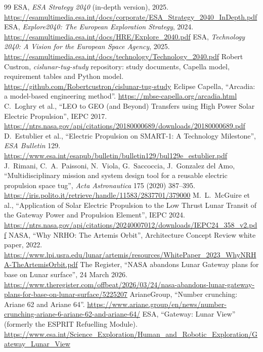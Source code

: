 \documentclass[11pt,a4paper]{article}
\newcommand{\studyauthor}{Robert Custron}
\newcommand{\repourl}{https://github.com/Robertcustron/cislunar-tug-study}
\begin{document}
\begin{thebibliography}{99}\small
\setlength{\itemsep}{1pt}
 ESA, \emph{ESA Strategy 2040} (in-depth version), 2025. \url{https://esamultimedia.esa.int/docs/corporate/ESA_Strategy_2040_InDepth.pdf}
 ESA, \emph{Explore2040: The European Exploration Strategy}, 2024. \url{https://esamultimedia.esa.int/docs/HRE/Explore_2040.pdf}
 ESA, \emph{Technology 2040: A Vision for the European Space Agency}, 2025. \url{https://esamultimedia.esa.int/docs/technology/Technology_2040.pdf}
 \studyauthor, \emph{cislunar-tug-study} repository: study documents, Capella model, requirement tables and Python model. \url{\repourl}
 Eclipse Capella, ``Arcadia: a model-based engineering method''. \url{https://mbse-capella.org/arcadia.html}
 C.~Loghry et al., ``LEO to GEO (and Beyond) Transfers using High Power Solar Electric Propulsion'', IEPC 2017. \url{https://ntrs.nasa.gov/api/citations/20180000689/downloads/20180000689.pdf}
 D.~Estublier et al., ``Electric Propulsion on SMART-1: A Technology Milestone'', \emph{ESA Bulletin} 129. \url{https://www.esa.int/esapub/bulletin/bulletin129/bul129e_estublier.pdf}
 J.~Rimani, C.~A.~Paissoni, N.~Viola, G.~Saccoccia, J.~Gonzalez del Amo, ``Multidisciplinary mission and system design tool for a reusable electric propulsion space tug'', \emph{Acta Astronautica} 175 (2020) 387--395. \url{https://iris.polito.it/retrieve/handle/11583/2837701/379000}
 M.~L.~McGuire et al., ``Application of Solar Electric Propulsion to the Low Thrust Lunar Transit of the Gateway Power and Propulsion Element'', IEPC 2024. \url{https://ntrs.nasa.gov/api/citations/20240007012/downloads/IEPC24_358_v2.pdf}
 NASA, ``Why NRHO: The Artemis Orbit'', Architecture Concept Review white paper, 2022. \url{https://www.lpi.usra.edu/lunar/artemis/resources/WhitePaper_2023_WhyNRHA-TheArtemisOrbit.pdf}
 The Register, ``NASA abandons Lunar Gateway plans for base on Lunar surface'', 24 March 2026. \url{https://www.theregister.com/offbeat/2026/03/24/nasa-abandons-lunar-gateway-plans-for-base-on-lunar-surface/5225207}
 ArianeGroup, ``Number crunching: Ariane 62 and Ariane 64''. \url{https://www.ariane.group/en/news/number-crunching-ariane-6-ariane-62-and-ariane-64/}
 ESA, ``Gateway: Lunar View'' (formerly the ESPRIT Refuelling Module). \url{https://www.esa.int/Science_Exploration/Human_and_Robotic_Exploration/Gateway_Lunar_View}

\end{thebibliography}
\end{document}
